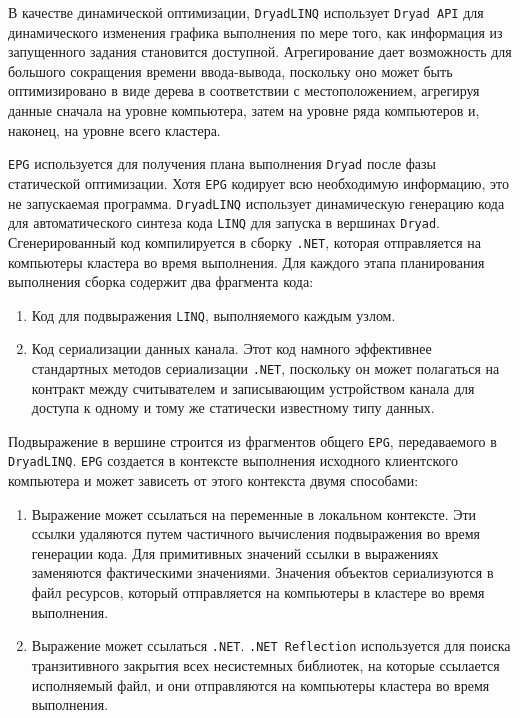 В качестве динамической оптимизации, \texttt{DryadLINQ} использует \texttt{Dryad API} для динамического изменения графика выполнения по мере того, как информация из запущенного задания становится доступной.
Агрегирование дает возможность для большого сокращения времени ввода-вывода, поскольку оно может быть оптимизировано в виде дерева в соответствии с местоположением, агрегируя данные сначала на уровне компьютера, затем на уровне ряда компьютеров и, наконец, на уровне всего кластера.

\texttt{EPG} используется для получения плана выполнения \texttt{Dryad} после фазы статической оптимизации. 
Хотя \texttt{EPG} кодирует всю необходимую информацию, это не запускаемая программа. 
\texttt{DryadLINQ} использует динамическую генерацию кода для автоматического синтеза кода \texttt{LINQ} для запуска в вершинах \texttt{Dryad}. 
Сгенерированный код компилируется в сборку \texttt{.NET}, которая отправляется на компьютеры кластера во время выполнения. 
Для каждого этапа планирования выполнения сборка содержит два фрагмента кода: 

\begin{enumerate}
  \item Код для подвыражения \texttt{LINQ}, выполняемого каждым узлом.
  \item Код сериализации данных канала. 
    Этот код намного эффективнее стандартных методов сериализации \texttt{.NET}, поскольку он может полагаться на контракт между считывателем и записывающим устройством канала для доступа к одному и тому же статически известному типу данных. 
\end{enumerate}

Подвыражение в вершине строится из фрагментов общего \texttt{EPG}, передаваемого в \texttt{DryadLINQ}. 
\texttt{EPG} создается в контексте выполнения исходного клиентского компьютера и может зависеть от этого контекста двумя способами:

\begin{enumerate}
  \item Выражение может ссылаться на переменные в локальном контексте. 
    Эти ссылки удаляются путем частичного вычисления подвыражения во время генерации кода. 
    Для примитивных значений ссылки в выражениях заменяются фактическими значениями. 
    Значения объектов сериализуются в файл ресурсов, который отправляется на компьютеры в кластере во время выполнения.
  \item Выражение может ссылаться \texttt{.NET}. 
    \texttt{.NET Reflection} используется для поиска транзитивного закрытия всех несистемных библиотек, на которые ссылается исполняемый файл, и они отправляются на компьютеры кластера во время выполнения.
\end{enumerate}

